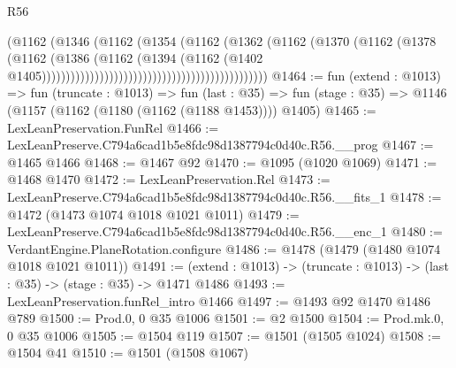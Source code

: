 \begin{lexlean}{R56}
\begin{coremodule}
                                                                  (@1162
                                                                    (@1346
                                                                      (@1162
                                                                        (@1354
                                                                          (@1162
                                                                            (@1362
                                                                              (@1162
                                                                                (@1370
                                                                                  (@1162
                                                                                    (@1378
                                                                                      (@1162
                                                                                        (@1386
                                                                                          (@1162
                                                                                            (@1394
                                                                                              (@1162
                                                                                                (@1402
                                                                                                  @1405)))))))))))))))))))))))))))))))))))))))))))))))
@1464 := fun (extend : @1013) =>
  fun (truncate : @1013) =>
  fun (last : @35) => fun (stage : @35) => @1146 (@1157 (@1162 (@1180 (@1162 (@1188 @1453)))) @1405)
@1465 := LexLeanPreservation.FunRel
@1466 := LexLeanPreserve.C794a6cad1b5e8fdc98d1387794c0d40c.R56.__prog
@1467 := @1465 @1466
@1468 := @1467 @92
@1470 := @1095 (@1020 @1069)
@1471 := @1468 @1470
@1472 := LexLeanPreservation.Rel
@1473 := LexLeanPreserve.C794a6cad1b5e8fdc98d1387794c0d40c.R56.__fits_1
@1478 := @1472 (@1473 @1074 @1018 @1021 @1011)
@1479 := LexLeanPreserve.C794a6cad1b5e8fdc98d1387794c0d40c.R56.__enc_1
@1480 := VerdantEngine.PlaneRotation.configure
@1486 := @1478 (@1479 (@1480 @1074 @1018 @1021 @1011))
@1491 := (extend : @1013) -> (truncate : @1013) -> (last : @35) -> (stage : @35) -> @1471 @1486
@1493 := LexLeanPreservation.funRel_intro @1466
@1497 := @1493 @92 @1470 @1486 @789
@1500 := Prod.{0, 0} @35 @1006
@1501 := @2 @1500
@1504 := Prod.mk.{0, 0} @35 @1006
@1505 := @1504 @119
@1507 := @1501 (@1505 @1024)
@1508 := @1504 @41
@1510 := @1501 (@1508 @1067)

\end{coremodule}
\end{lexlean}
